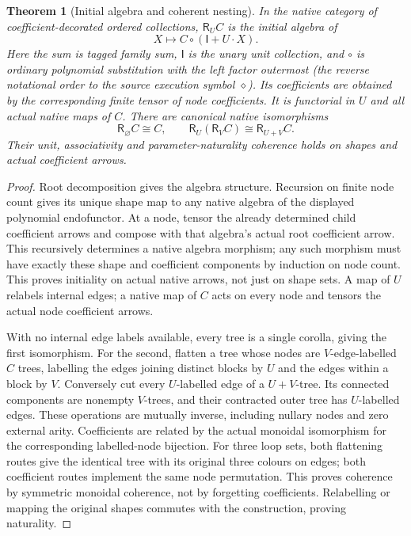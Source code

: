 \documentclass[11pt]{article}
\newtheorem{theorem}{Theorem}\newtheorem{lemma}[theorem]{Lemma}\newtheorem{proposition}[theorem]{Proposition}
\newcommand{\R}{\mathsf R}\newcommand{\Col}{\mathsf{Col}}\newcommand{\Vect}{\mathbf{Vect}_k}
\begin{document}
\begin{theorem}[Initial algebra and coherent nesting]\label{thm:grade}
In the native category of coefficient-decorated ordered collections, $\R_U C$ is the initial algebra of
\[
 X\longmapsto C\circ(\mathsf I+U\cdot X).
\]
Here the sum is tagged family sum, $\mathsf I$ is the unary unit collection, and $\circ$ is ordinary polynomial substitution with the left factor outermost (the reverse notational order to the source execution symbol $\diamond$). Its coefficients are obtained by the corresponding finite tensor of node coefficients. It is functorial in $U$ and all actual native maps of $C$. There are canonical native isomorphisms
\[
 \R_\varnothing C\cong C,
 \qquad
 \R_U(\R_V C)\cong\R_{U+V}C.
 \tag{G}
\]
Their unit, associativity and parameter-naturality coherence holds on shapes and actual coefficient arrows.
\end{theorem}
\begin{proof}
Root decomposition gives the algebra structure. Recursion on finite node count gives its unique shape map to any native algebra of the displayed polynomial endofunctor. At a node, tensor the already determined child coefficient arrows and compose with that algebra's actual root coefficient arrow. This recursively determines a native algebra morphism; any such morphism must have exactly these shape and coefficient components by induction on node count. This proves initiality on actual native arrows, not just on shape sets. A map of $U$ relabels internal edges; a native map of $C$ acts on every node and tensors the actual node coefficient arrows.

With no internal edge labels available, every tree is a single corolla, giving the first isomorphism. For the second, flatten a tree whose nodes are $V$-edge-labelled $C$ trees, labelling the edges joining distinct blocks by $U$ and the edges within a block by $V$. Conversely cut every $U$-labelled edge of a $U+V$-tree. Its connected components are nonempty $V$-trees, and their contracted outer tree has $U$-labelled edges. These operations are mutually inverse, including nullary nodes and zero external arity. Coefficients are related by the actual monoidal isomorphism for the corresponding labelled-node bijection. For three loop sets, both flattening routes give the identical tree with its original three colours on edges; both coefficient routes implement the same node permutation. This proves coherence by symmetric monoidal coherence, not by forgetting coefficients. Relabelling or mapping the original shapes commutes with the construction, proving naturality.
\end{proof}
\end{document}

